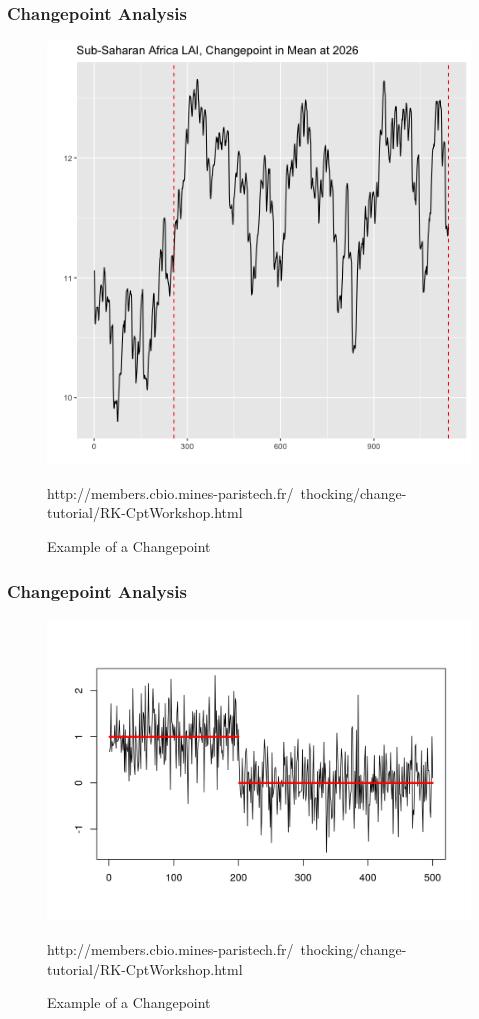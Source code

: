 \documentclass{beamer}
\begin{document}
\begin{frame}
\frametitle{Changepoint Analysis}
\begin{figure}
\centering
\includegraphics[width=0.75\linewidth]{../img/changepoint_LAI.png}
\caption{Example of a Changepoint}
http://members.cbio.mines-paristech.fr/~thocking/change-tutorial/RK-CptWorkshop.html
\end{figure}
\end{frame}

\begin{frame}
\frametitle{Changepoint Analysis}
\begin{figure}
\centering
\includegraphics[width=0.75\linewidth]{../img/changepointex.png}
\caption{Example of a Changepoint}
http://members.cbio.mines-paristech.fr/~thocking/change-tutorial/RK-CptWorkshop.html
\end{figure}
\end{frame}
\end{document}
